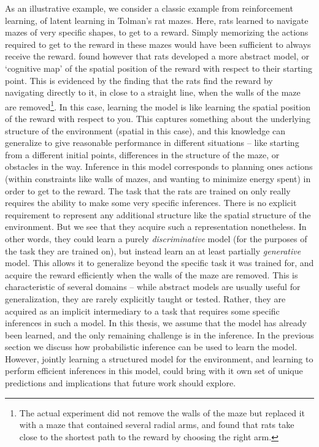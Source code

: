 As an illustrative example, we consider a classic example from reinforcement learning, of latent learning in Tolman's rat mazes\citep{tolman1948cognitive}. Here, rats learned to navigate mazes of very specific shapes, to get to a reward. Simply memorizing the actions required to get to the reward in these mazes would have been sufficient to always receive the reward. \citet{tolman1948cognitive} found however that rats developed a more abstract model, or `cognitive map' of the spatial position of the reward with respect to their starting point. This is evidenced by the finding that the rats find the reward by navigating directly to it, in close to a straight line, when the walls of the maze are removed\footnote{The actual experiment did not remove the walls of the maze but replaced it with a maze that contained several radial arms, and found that rats take close to the shortest path to the reward by choosing the right arm.}. In this case, learning the model is like learning the spatial position of the reward with respect to you. This captures something about the underlying structure of the environment (spatial in this case), and this knowledge can generalize to give reasonable performance in different situations -- like starting from a different initial points, differences in the structure of the maze, or obstacles in the way. Inference in this model corresponds to planning ones actions (within constraints like walls of mazes, and wanting to minimize energy spent) in order to get to the reward. The task that the rats are trained on only really requires the ability to make some very specific inferences. There is no explicit requirement to represent any additional structure like the spatial structure of the environment. But we see that they acquire such a representation nonetheless. In other words, they could learn a purely \textit{discriminative} model (for the purposes of the task they are trained on), but instead learn an at least partially \textit{generative} model. This allows it to generalize beyond the specific task it was trained for, and acquire the reward efficiently when the walls of the maze are removed. This is characteristic of several domains -- while abstract models are usually useful for generalization, they are rarely explicitly taught or tested. Rather, they are acquired as an implicit intermediary to a task that requires  some specific inferences in such a model. In this thesis, we assume that the model has already been learned, and the only remaining challenge is in the inference. In the previous section we discuss how probabilistic inference can be used to learn the model. However, jointly learning a structured model for the environment, and learning to perform efficient inferences in this model, could bring with it own set of unique predictions and implications that future work should explore.

